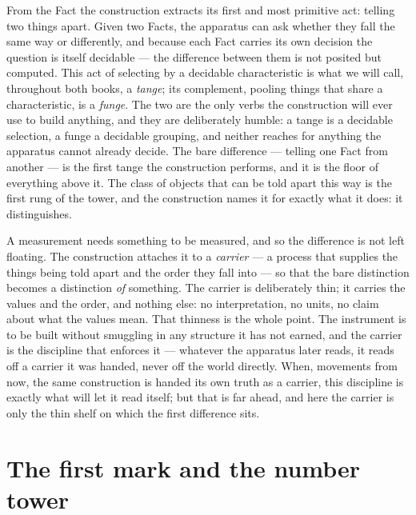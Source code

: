From the Fact the construction extracts its first and most primitive act: telling two things apart. Given
two Facts, the apparatus can ask whether they fall the same way or differently, and because each Fact
carries its own decision the question is itself decidable --- the difference between them is not posited
but computed. This act of selecting by a decidable characteristic is what we will call, throughout both
books, a \emph{tange}; its complement, pooling things that share a characteristic, is a \emph{funge}. The
two are the only verbs the construction will ever use to build anything, and they are deliberately humble:
a tange is a decidable selection, a funge a decidable grouping, and neither reaches for anything the
apparatus cannot already decide. The bare difference --- telling one Fact from another --- is the first
tange the construction performs, and it is the floor of everything above it. The class of objects that can
be told apart this way is the first rung of the tower, and the construction names it for exactly what it
does: it distinguishes.

A measurement needs something to be measured, and so the difference is not left floating. The construction
attaches it to a \emph{carrier} --- a process that supplies the things being told apart and the order they
fall into --- so that the bare distinction becomes a distinction \emph{of} something. The carrier is
deliberately thin; it carries the values and the order, and nothing else: no interpretation, no units, no
claim about what the values mean. That thinness is the whole point. The instrument is to be built without
smuggling in any structure it has not earned, and the carrier is the discipline that enforces it ---
whatever the apparatus later reads, it reads off a carrier it was handed, never off the world directly.
When, movements from now, the same construction is handed its own truth as a carrier, this discipline is
exactly what will let it read itself; but that is far ahead, and here the carrier is only the thin shelf on
which the first difference sits.

\section{The first mark and the number tower}
\label{se:first-mark-number-tower}

